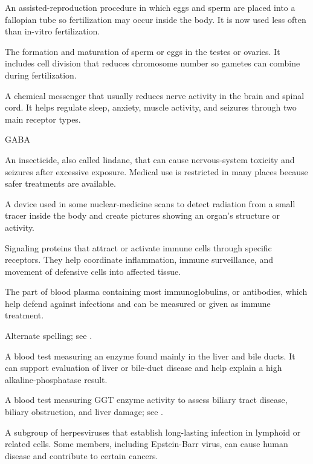  An assisted-reproduction procedure in which eggs and sperm are placed into a fallopian tube so fertilization may occur inside the body. It is now used less often than in-vitro fertilization.

 The formation and maturation of sperm or eggs in the testes or ovaries. It includes cell division that reduces chromosome number so gametes can combine during fertilization.

 A chemical messenger that usually reduces nerve activity in the brain and spinal cord. It helps regulate sleep, anxiety, muscle activity, and seizures through two main receptor types.

\synonyms
GABA

 An insecticide, also called lindane, that can cause nervous-system toxicity and seizures after excessive exposure. Medical use is restricted in many places because safer treatments are available.

 A device used in some nuclear-medicine scans to detect radiation from a small tracer inside the body and create pictures showing an organ’s structure or activity.

 Signaling proteins that attract or activate immune cells through specific receptors. They help coordinate inflammation, immune surveillance, and movement of defensive cells into affected tissue.

 The part of blood plasma containing most immunoglobulins, or antibodies, which help defend against infections and can be measured or given as immune treatment.

 Alternate spelling; see .

 A blood test measuring an enzyme found mainly in the liver and bile ducts. It can support evaluation of liver or bile-duct disease and help explain a high alkaline-phosphatase result.

 A blood test measuring GGT enzyme activity to assess biliary tract disease, biliary obstruction, and liver damage; see .

 A subgroup of herpesviruses that establish long-lasting infection in lymphoid or related cells. Some members, including Epstein-Barr virus, can cause human disease and contribute to certain cancers.

